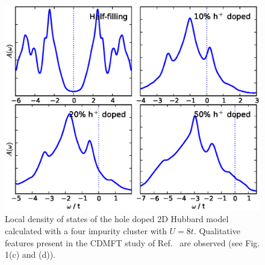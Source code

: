 \documentclass[aps,twocolumn,nobibnotes]{revtex4}
\begin{document}
\begin{figure}
\begin{center}
    \vspace{-2mm}
\includegraphics[scale=0.425]{Plots/Doping/2D/nImp4/U8/LargerBroadening/2DHub_Doping.eps}
\end{center}
    \vspace{-8mm}
\caption{Local density of states of the hole doped 2D Hubbard model calculated with a four impurity cluster with $U = 8t$. Qualitative
features present in the CDMFT study of Ref.~ are observed (see Fig. 1(c) and (d)).}
\label{2D_Doped}
\end{figure}
\end{document}
